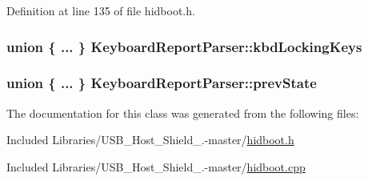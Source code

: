 \-Definition at line 135 of file hidboot.\-h.

\hypertarget{class_keyboard_report_parser_aa81cce711bcff4dc151f2b509b527700}{
\subsubsection[{kbd\-Locking\-Keys}]{\setlength{\rightskip}{0pt plus 5cm}union \{ ... \}   {\bf \-Keyboard\-Report\-Parser\-::kbd\-Locking\-Keys}}}\label{class_keyboard_report_parser_aa81cce711bcff4dc151f2b509b527700}
\hypertarget{class_keyboard_report_parser_a60f8ec59efd65a67950cfd108742f035}{
\subsubsection[{prev\-State}]{\setlength{\rightskip}{0pt plus 5cm}union \{ ... \}   {\bf \-Keyboard\-Report\-Parser\-::prev\-State}}}\label{class_keyboard_report_parser_a60f8ec59efd65a67950cfd108742f035}


\-The documentation for this class was generated from the following files\-:\begin{DoxyCompactItemize}
\item 
\-Included Libraries/\-U\-S\-B\-\_\-\-Host\-\_\-\-Shield\-\_.-\/master/\hyperlink{hidboot_8h}{hidboot.\-h}\item 
\-Included Libraries/\-U\-S\-B\-\_\-\-Host\-\_\-\-Shield\-\_.-\/master/\hyperlink{hidboot_8cpp}{hidboot.\-cpp}\end{DoxyCompactItemize}
